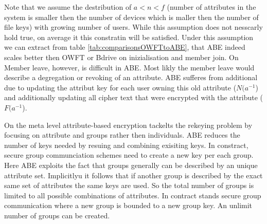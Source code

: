Note that we assume the destribution of $a < n < f$ (number of attributes in the system is smaller then the number of devices which is maller then the number of file keys) with growing number of users. While this assumption does not nesscarly hold true, on average it this constratin will be satisfied. Under this assumption we can extract from table \ref{tab:comparisonsOWFTtoABE}, that \ac{ABE} indeed scales better then \ac{OWFT} or Bdrive on inizialisation and member join. On Member leave, however, is difficult in \ac{ABE}. Most likly the member leave would describe a degregation or revoking of an attribute. \ac{ABE} sufferes from additional due to updating the attribut key for each user owning this old attribute ($N(a^{-1}$) and additionally updating all cipher text that were encrypted with the attribute ($F(a^{-1}$).

On the meta level attribute-based encryption tackelts the rekeying problem by focusing on attribute and groups rather then individuals. \ac{ABE} reduces the number of keys needed by resuing and combining exisiting keys. In constract, secure group communciation schemes need to create a new key per each group. Here \ac{ABE} exploits the fact that groups generally can be described by an unique attribute set. Implicitlyu it follows that if another group is described by the exact same set of attributes the same keys are used. So the total number of groups is limited to all possible combinations of attributes. In contract stands secure group communication where a new group is bounded to a new group key. An unlimit number of groups can be created.



